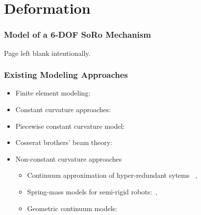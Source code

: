 \section{Deformation}
\begin{frame}
\frametitle{Model of a 6-DOF SoRo Mechanism}
\centering
Page left blank intentionally.
\end{frame}

\begin{frame}
\frametitle{Existing Modeling Approaches}
\begin{itemize}
	\tiny
	\item Finite element modeling:~\cite{Nesme2005, Nesme2006, JamesBern, GentBook}
	\vspace{0.1in}
	\item Constant curvature approaches:~\cite{Hannan2003, Hannan2000, Jones2006} 
	\vspace{0.1in}
	\item Piecewise constant curvature model:~\cite{Jones2006}
	\vspace{0.1in}
	\item Cosserat brothers' beam theory:~\cite{Renda2014Cosserat, TrivediCosserat}
	\item Non-constant curvature approaches
	\vspace{0.1in}
	\begin{itemize}
		\tiny
		\item Continuum approximation of hyper-redundant sytems \eg~\cite{HyperMochi, Chirikjian1995, Chirikjian1994}, 
		\vspace{0.1in}
		\item Spring-mass models for semi-rigid robots:~\cite{yekutieli2005dynamic, zheng2012dynamic}, 
		\vspace{0.1in}
		\item Geometric continuum models:~\cite{boyer2006macro, GentBook, OgdenBook, SedalFREE2018, Holzapfel2000, rucker2010geometrically, Demirkoparan}
	\end{itemize}
\end{itemize}
\end{frame}


